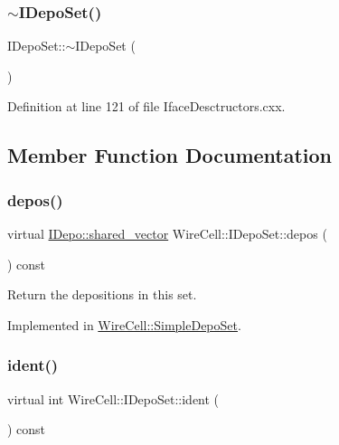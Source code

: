 \subsubsection{\texorpdfstring{$\sim$\+I\+Depo\+Set()}{~IDepoSet()}}
{\footnotesize\ttfamily I\+Depo\+Set\+::$\sim$\+I\+Depo\+Set (\begin{DoxyParamCaption}{ }\end{DoxyParamCaption})\hspace{0.3cm}{\ttfamily [virtual]}}



Definition at line 121 of file Iface\+Desctructors.\+cxx.



\subsection{Member Function Documentation}
\mbox{\label{class_wire_cell_1_1_i_depo_set_abbaa8ccebefb3034e8c725d8fe069508}} 
\subsubsection{\texorpdfstring{depos()}{depos()}}
{\footnotesize\ttfamily virtual \hyperlink{class_wire_cell_1_1_i_data_a6edac35e7dd886018740993b28c7ca1e}{I\+Depo\+::shared\+\_\+vector} Wire\+Cell\+::\+I\+Depo\+Set\+::depos (\begin{DoxyParamCaption}{ }\end{DoxyParamCaption}) const\hspace{0.3cm}{\ttfamily [pure virtual]}}



Return the depositions in this set. 



Implemented in \hyperlink{class_wire_cell_1_1_simple_depo_set_ad52d0c0bbec9c993efbba14c1aaed564}{Wire\+Cell\+::\+Simple\+Depo\+Set}.

\mbox{\label{class_wire_cell_1_1_i_depo_set_a569837954a71574c7f8675da720d280a}} 
\subsubsection{\texorpdfstring{ident()}{ident()}}
{\footnotesize\ttfamily virtual int Wire\+Cell\+::\+I\+Depo\+Set\+::ident (\begin{DoxyParamCaption}{ }\end{DoxyParamCaption}) const\hspace{0.3cm}{\ttfamily [pure virtual]}}



